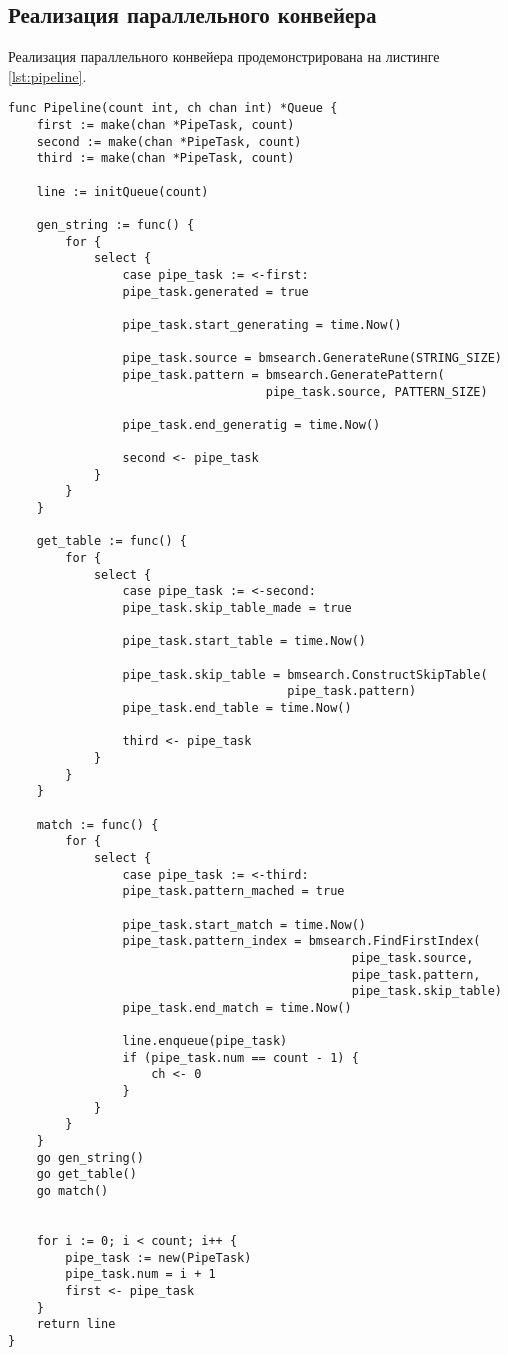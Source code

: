 \subsection{Реализация параллельного конвейера}
Реализация параллельного конвейера продемонстрирована на листинге \ref{lst:pipeline}.
\begin{lstlisting}[label=lst:pipeline,caption=Реализация параллельного конвейера]
func Pipeline(count int, ch chan int) *Queue {
	first := make(chan *PipeTask, count)
	second := make(chan *PipeTask, count)
	third := make(chan *PipeTask, count)
	
	line := initQueue(count)
	
	gen_string := func() {
		for {
			select {
				case pipe_task := <-first:
				pipe_task.generated = true
				
				pipe_task.start_generating = time.Now()
				
				pipe_task.source = bmsearch.GenerateRune(STRING_SIZE)
				pipe_task.pattern = bmsearch.GeneratePattern(
									pipe_task.source, PATTERN_SIZE)
				
				pipe_task.end_generatig = time.Now()
				
				second <- pipe_task
			}
		}
	}
	
	get_table := func() {
		for {
			select {
				case pipe_task := <-second:
				pipe_task.skip_table_made = true
				
				pipe_task.start_table = time.Now()
				
				pipe_task.skip_table = bmsearch.ConstructSkipTable(
									   pipe_task.pattern)
				pipe_task.end_table = time.Now()
				
				third <- pipe_task
			}
		}
	}
	
	match := func() {
		for {
			select {
				case pipe_task := <-third:
				pipe_task.pattern_mached = true
				
				pipe_task.start_match = time.Now()
				pipe_task.pattern_index = bmsearch.FindFirstIndex(
												pipe_task.source, 
												pipe_task.pattern,
												pipe_task.skip_table)
				pipe_task.end_match = time.Now()
				
				line.enqueue(pipe_task)
				if (pipe_task.num == count - 1) {
					ch <- 0
				}
			}
		}
	}
	go gen_string()
	go get_table()
	go match()
	
	
	for i := 0; i < count; i++ {
		pipe_task := new(PipeTask)
		pipe_task.num = i + 1
		first <- pipe_task
	}
	return line
}
\end{lstlisting}
